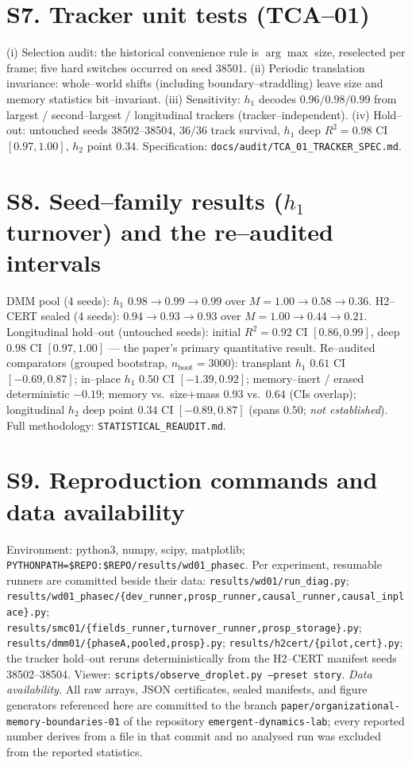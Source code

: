 \documentclass[11pt]{article}
\begin{document}
\section{S7. Tracker unit tests (TCA--01)}
(i) Selection audit: the historical convenience rule is $\arg\max$ size, reselected per frame; five hard
switches occurred on seed 38501. (ii) Periodic translation invariance: whole--world shifts (including
boundary--straddling) leave size and memory statistics bit--invariant. (iii) Sensitivity: $h_1$ decodes
$0.96/0.98/0.99$ from largest / second--largest / longitudinal trackers (tracker--independent).
(iv) Hold--out: untouched seeds 38502--38504, $36/36$ track survival, $h_1$ deep $R^2=0.98$ CI $[0.97,1.00]$,
$h_2$ point $0.34$. Specification: \texttt{docs/audit/TCA\_01\_TRACKER\_SPEC.md}.

\section{S8. Seed--family results ($h_1$ turnover) and the re--audited intervals}
DMM pool (4 seeds): $h_1$ $0.98\to0.99\to0.99$ over $M=1.00\to0.58\to0.36$. H2--CERT sealed (4 seeds):
$0.94\to0.93\to0.93$ over $M=1.00\to0.44\to0.21$. Longitudinal hold--out (untouched seeds): initial
$R^2=0.92$ CI $[0.86,0.99]$, deep $0.98$ CI $[0.97,1.00]$ --- the paper's primary quantitative result.
Re--audited comparators (grouped bootstrap, $n_{\mathrm{boot}}=3000$): transplant $h_1$ $0.61$ CI
$[-0.69,0.87]$; in--place $h_1$ $0.50$ CI $[-1.39,0.92]$; memory--inert / erased deterministic $-0.19$;
memory vs.\ size$+$mass $0.93$ vs.\ $0.64$ (CIs overlap); longitudinal $h_2$ deep point $0.34$ CI
$[-0.89,0.87]$ (spans $0.50$; \emph{not established}). Full methodology: \texttt{STATISTICAL\_REAUDIT.md}.

\section{S9. Reproduction commands and data availability}
Environment: python3, numpy, scipy, matplotlib; \texttt{PYTHONPATH=\$REPO:\$REPO/results/wd01\_phasec}.
Per experiment, resumable runners are committed beside their data:
\texttt{results/wd01/run\_diag.py}; \texttt{results/wd01\_phasec/\{dev\_runner,prosp\_runner,causal\_runner,causal\_inplace\}.py};
\texttt{results/smc01/\{fields\_runner,turnover\_runner,prosp\_storage\}.py};
\texttt{results/dmm01/\{phaseA,pooled,prosp\}.py}; \texttt{results/h2cert/\{pilot,cert\}.py};
the tracker hold--out reruns deterministically from the H2--CERT manifest seeds 38502--38504. Viewer:
\texttt{scripts/observe\_droplet.py --preset story}.
\emph{Data availability.} All raw arrays, JSON certificates, sealed manifests, and figure generators
referenced here are committed to the branch \texttt{paper/organizational-memory-boundaries-01} of the
repository \texttt{emergent-dynamics-lab}; every reported number derives from a file in that commit and no
analysed run was excluded from the reported statistics.
\end{document}
